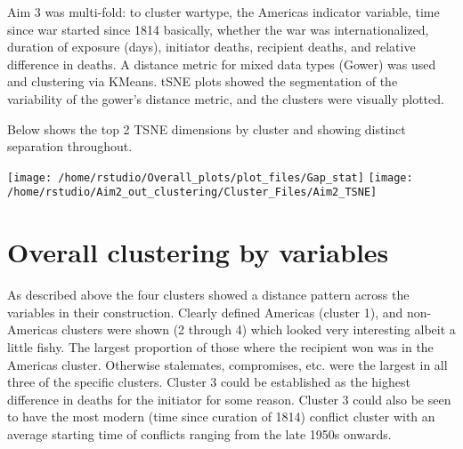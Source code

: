 \documentclass[
]{article}
\begin{document}
Aim 3 was multi-fold: to cluster wartype, the Americas indicator
variable, time since war started since 1814 basically, whether the war
was internationalized, duration of exposure (days), initiator deaths,
recipient deaths, and relative difference in deaths. A distance metric
for mixed data types (Gower) was used and clustering via KMeans. tSNE
plots showed the segmentation of the variability of the gower's distance
metric, and the clusters were visually plotted.

Below shows the top 2 TSNE dimensions by cluster and showing distinct
separation throughout.

\texttt{[image: /home/rstudio/Overall\_plots/plot\_files/Gap\_stat]}
\texttt{[image: /home/rstudio/Aim2\_out\_clustering/Cluster\_Files/Aim2\_TSNE]}

\hypertarget{overall-clustering-by-variables}{%
\section{Overall clustering by
variables}\label{overall-clustering-by-variables}}

As described above the four clusters showed a distance pattern across
the variables in their construction. Clearly defined Americas (cluster
1), and non-Americas clusters were shown (2 through 4) which looked very
interesting albeit a little fishy. The largest proportion of those where
the recipient won was in the Americas cluster. Otherwise stalemates,
compromises, etc. were the largest in all three of the specific
clusters. Cluster 3 could be established as the highest difference in
deaths for the initiator for some reason. Cluster 3 could also be seen
to have the most modern (time since curation of 1814) conflict cluster
with an average starting time of conflicts ranging from the late 1950s
onwards.
\end{document}
